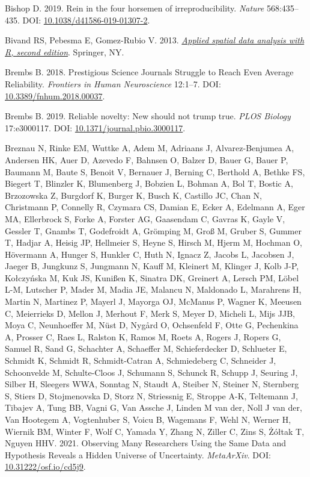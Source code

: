 \documentclass[10pt,a4paper]{article}
\newlength{\cslhangindent}
\newlength{\cslentryspacingunit} %
\newenvironment{CSLReferences}[2] %
 {%
  \setlength{\parindent}{0pt}
  \ifodd #1
  \let\oldpar\par
  \def\par{\hangindent=\cslhangindent\oldpar}
  \fi
  \setlength{\parskip}{#2\cslentryspacingunit}
 }%
 {}
\begin{document}
\begin{CSLReferences}{1}{0}
\leavevmode{}%
Bishop D. 2019. Rein in the four horsemen of irreproducibility. \emph{Nature} 568:435--435. DOI: \href{https://doi.org/10.1038/d41586-019-01307-2}{10.1038/d41586-019-01307-2}.

\leavevmode{}%
Bivand RS, Pebesma E, Gomez-Rubio V. 2013. \emph{\href{https://asdar-book.org/}{Applied spatial data analysis with {R}, second edition}}. Springer, NY.

\leavevmode{}%
Brembs B. 2018. Prestigious {Science} {Journals} {Struggle} to {Reach} {Even} {Average} {Reliability}. \emph{Frontiers in Human Neuroscience} 12:1--7. DOI: \href{https://doi.org/10.3389/fnhum.2018.00037}{10.3389/fnhum.2018.00037}.

\leavevmode{}%
Brembs B. 2019. Reliable novelty: {New} should not trump true. \emph{PLOS Biology} 17:e3000117. DOI: \href{https://doi.org/10.1371/journal.pbio.3000117}{10.1371/journal.pbio.3000117}.

\leavevmode{}%
Breznau N, Rinke EM, Wuttke A, Adem M, Adriaans J, Alvarez-Benjumea A, Andersen HK, Auer D, Azevedo F, Bahnsen O, Balzer D, Bauer G, Bauer P, Baumann M, Baute S, Benoit V, Bernauer J, Berning C, Berthold A, Bethke FS, Biegert T, Blinzler K, Blumenberg J, Bobzien L, Bohman A, Bol T, Bostic A, Brzozowska Z, Burgdorf K, Burger K, Busch K, Castillo JC, Chan N, Christmann P, Connelly R, Czymara CS, Damian E, Ecker A, Edelmann A, Eger MA, Ellerbrock S, Forke A, Forster AG, Gaasendam C, Gavras K, Gayle V, Gessler T, Gnambs T, Godefroidt A, Grömping M, Groß M, Gruber S, Gummer T, Hadjar A, Heisig JP, Hellmeier S, Heyne S, Hirsch M, Hjerm M, Hochman O, Hövermann A, Hunger S, Hunkler C, Huth N, Ignacz Z, Jacobs L, Jacobsen J, Jaeger B, Jungkunz S, Jungmann N, Kauff M, Kleinert M, Klinger J, Kolb J-P, Kołczyńska M, Kuk JS, Kunißen K, Sinatra DK, Greinert A, Lersch PM, Löbel L-M, Lutscher P, Mader M, Madia JE, Malancu N, Maldonado L, Marahrens H, Martin N, Martinez P, Mayerl J, Mayorga OJ, McManus P, Wagner K, Meeusen C, Meierrieks D, Mellon J, Merhout F, Merk S, Meyer D, Micheli L, Mijs JJB, Moya C, Neunhoeffer M, Nüst D, Nygård O, Ochsenfeld F, Otte G, Pechenkina A, Prosser C, Raes L, Ralston K, Ramos M, Roets A, Rogers J, Ropers G, Samuel R, Sand G, Schachter A, Schaeffer M, Schieferdecker D, Schlueter E, Schmidt K, Schmidt R, Schmidt-Catran A, Schmiedeberg C, Schneider J, Schoonvelde M, Schulte-Cloos J, Schumann S, Schunck R, Schupp J, Seuring J, Silber H, Sleegers WWA, Sonntag N, Staudt A, Steiber N, Steiner N, Sternberg S, Stiers D, Stojmenovska D, Storz N, Striessnig E, Stroppe A-K, Teltemann J, Tibajev A, Tung BB, Vagni G, Van Assche J, Linden M van der, Noll J van der, Van Hootegem A, Vogtenhuber S, Voicu B, Wagemans F, Wehl N, Werner H, Wiernik BM, Winter F, Wolf C, Yamada Y, Zhang N, Ziller C, Zins S, Żółtak T, Nguyen HHV. 2021. Observing {Many} {Researchers} {Using} the {Same} {Data} and {Hypothesis} {Reveals} a {Hidden} {Universe} of {Uncertainty}. \emph{MetaArXiv}. DOI: \href{https://doi.org/10.31222/osf.io/cd5j9}{10.31222/osf.io/cd5j9}.


\end{CSLReferences}
\end{document}
